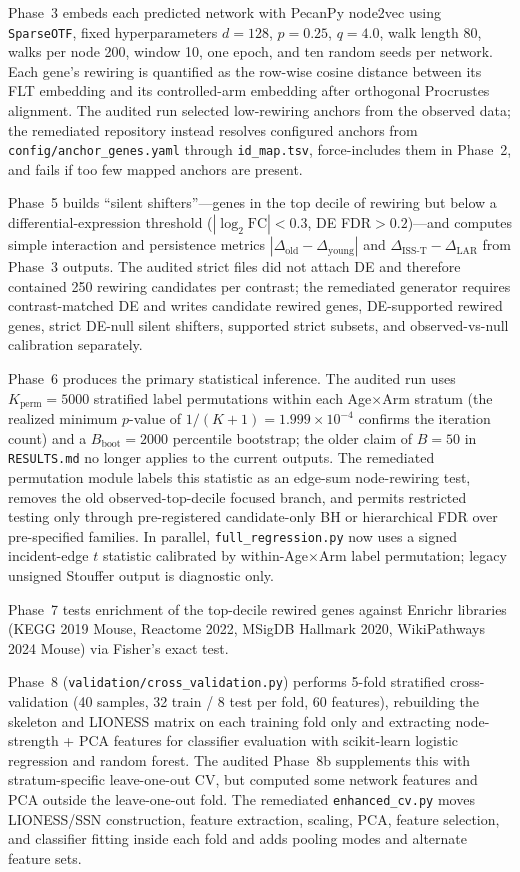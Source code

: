 \documentclass[11pt]{article}
\newcommand{\code}[1]{\texttt{#1}}
\newcommand{\pkg}[1]{\textsf{#1}}
\begin{document}
Phase~3 embeds each predicted network with \pkg{PecanPy} node2vec using \code{SparseOTF}, fixed hyperparameters $d{=}128$, $p{=}0.25$, $q{=}4.0$, walk length 80, walks per node 200, window 10, one epoch, and ten random seeds per network. Each gene's rewiring is quantified as the row-wise cosine distance between its FLT embedding and its controlled-arm embedding after orthogonal Procrustes alignment. The audited run selected low-rewiring anchors from the observed data; the remediated repository instead resolves configured anchors from \code{config/anchor\_genes.yaml} through \code{id\_map.tsv}, force-includes them in Phase~2, and fails if too few mapped anchors are present.

Phase~5 builds ``silent shifters''---genes in the top decile of rewiring but below a differential-expression threshold ($|\log_2 \mathrm{FC}|<0.3$, DE FDR$>0.2$)---and computes simple interaction and persistence metrics $|\Delta_{\text{old}} - \Delta_{\text{young}}|$ and $\Delta_{\text{ISS-T}} - \Delta_{\text{LAR}}$ from Phase~3 outputs. The audited strict files did not attach DE and therefore contained 250 rewiring candidates per contrast; the remediated generator requires contrast-matched DE and writes candidate rewired genes, DE-supported rewired genes, strict DE-null silent shifters, supported strict subsets, and observed-vs-null calibration separately.

Phase~6 produces the primary statistical inference. The audited run uses $K_{\text{perm}}{=}5000$ stratified label permutations within each Age$\times$Arm stratum (the realized minimum $p$-value of $1/(K{+}1) = 1.999\times 10^{-4}$ confirms the iteration count) and a $B_{\text{boot}}{=}2000$ percentile bootstrap; the older claim of $B{=}50$ in \code{RESULTS.md} no longer applies to the current outputs. The remediated permutation module labels this statistic as an edge-sum node-rewiring test, removes the old observed-top-decile focused branch, and permits restricted testing only through pre-registered candidate-only BH or hierarchical FDR over pre-specified families. In parallel, \code{full\_regression.py} now uses a signed incident-edge $t$ statistic calibrated by within-Age$\times$Arm label permutation; legacy unsigned Stouffer output is diagnostic only.

Phase~7 tests enrichment of the top-decile rewired genes against Enrichr libraries (KEGG 2019 Mouse, Reactome 2022, MSigDB Hallmark 2020, WikiPathways 2024 Mouse) via Fisher's exact test.

Phase~8 (\code{validation/cross\_validation.py}) performs 5-fold stratified cross-validation (40 samples, 32 train / 8 test per fold, 60 features), rebuilding the skeleton and LIONESS matrix on each training fold only and extracting node-strength + PCA features for classifier evaluation with \pkg{scikit-learn} logistic regression and random forest. The audited Phase~8b supplements this with stratum-specific leave-one-out CV, but computed some network features and PCA outside the leave-one-out fold. The remediated \code{enhanced\_cv.py} moves LIONESS/SSN construction, feature extraction, scaling, PCA, feature selection, and classifier fitting inside each fold and adds pooling modes and alternate feature sets.
\end{document}
